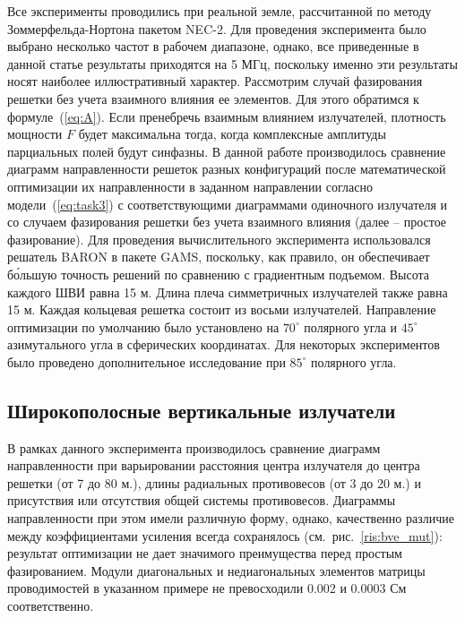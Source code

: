 Все эксперименты проводились при реальной земле, рассчитанной по методу Зоммерфельда-Нортона пакетом NEC-2. Для проведения эксперимента было выбрано несколько частот в рабочем диапазоне, однако, все приведенные в данной статье результаты приходятся на 5 МГц, поскольку именно эти результаты носят наиболее иллюстративный характер.
Рассмотрим случай фазирования решетки без учета взаимного влияния ее элементов. Для этого обратимся к формуле~(\ref{eq:A}). Если пренебречь взаимным влиянием излучателей, плотность мощности $F$ будет максимальна тогда, когда комплексные амплитуды парциальных полей будут синфазны. В данной работе производилось сравнение диаграмм направленности решеток разных конфигураций после математической оптимизации их направленности в заданном направлении согласно модели~(\ref{eq:task3}) с соответствующими диаграммами одиночного излучателя и со случаем фазирования решетки без учета взаимного влияния (далее – простое фазирование).
Для проведения вычислительного эксперимента использовался решатель BARON в пакете GAMS, поскольку, как правило, он обеспечивает бо́льшую точность решений по сравнению с градиентным подъемом. Высота каждого ШВИ равна 15 м. Длина плеча симметричных излучателей также равна 15 м.
Каждая кольцевая решетка состоит из восьми излучателей. Направление оптимизации по умолчанию было установлено на $70^{\circ}$ полярного угла и $45^\circ$ азимутального угла в сферических координатах. Для некоторых экспериментов было проведено дополнительное исследование при $85^\circ$ полярного угла.


\subsection{Широкополосные вертикальные излучатели} 
В рамках данного эксперимента производилось сравнение диаграмм направленности при варьировании расстояния центра излучателя до центра решетки (от 7 до 80 м.), длины радиальных противовесов (от 3 до 20 м.) и присутствия или отсутствия общей системы противовесов. Диаграммы направленности при этом имели различную форму, однако, качественно различие между коэффициентами усиления всегда сохранялось (см.~рис.~\ref{ris:bve_mut}): результат оптимизации не дает значимого преимущества перед простым фазированием.  Модули диагональных и недиагональных элементов матрицы проводимостей в указанном примере не превосходили 0.002 и 0.0003 См соответственно.

